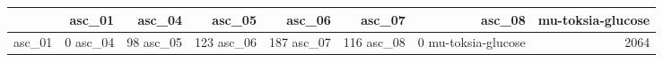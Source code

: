 \begin{tabular}{lrrrrrrr}
\toprule
 & asc_01 & asc_04 & asc_05 & asc_06 & asc_07 & asc_08 & mu-toksia-glucose \\
\midrule
asc_01 & 0%
asc_04 & 98%
asc_05 & 123%
asc_06 & 187%
asc_07 & 116%
asc_08 & 0%
mu-toksia-glucose & 2064%
\bottomrule
\end{tabular}

